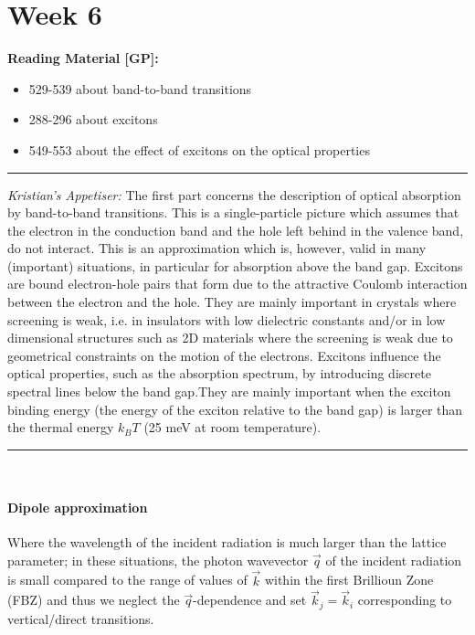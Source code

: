 \section{Week 6}
\textbf{Reading Material [GP]:}
\begin{itemize}
    \item 529-539 about band-to-band transitions
    \item 288-296 about excitons 
    \item 549-553 about the effect of excitons on the optical properties
\end{itemize}
\rule{\textwidth}{1pt}
\emph{Kristian's Appetiser:}
The first part concerns the description of optical absorption by band-to-band transitions. This is a single-particle picture which assumes that the electron in the conduction band and the hole left behind in the valence band, do not interact. This is an approximation which is, however, valid in many (important) situations, in particular for absorption above the band gap. Excitons are bound electron-hole pairs that form due to the attractive Coulomb interaction between the electron and the hole. They are mainly important in crystals where screening is weak, i.e. in insulators with low dielectric constants and/or in low dimensional structures such as 2D materials where the screening is weak due to geometrical constraints on the motion of the electrons. Excitons influence the optical properties, such as the absorption spectrum, by introducing discrete spectral lines below the band gap.They are mainly important when the exciton binding energy (the energy of the exciton relative to the band gap) is larger than the thermal energy $k_{B}T$ (25 meV at room temperature).
\rule{\textwidth}{1pt} \\
\paragraph{Dipole approximation} Where the wavelength of the incident radiation is much larger than the lattice parameter; in these situations, the photon wavevector $\vec{q}$ of the incident radiation is small compared to the range of values of $\vec{k}$ within the first Brillioun Zone (FBZ) and thus we neglect the $\vec{q}$-dependence and set $\vec{k}_j = \vec{k}_i$ corresponding to vertical/direct transitions.

